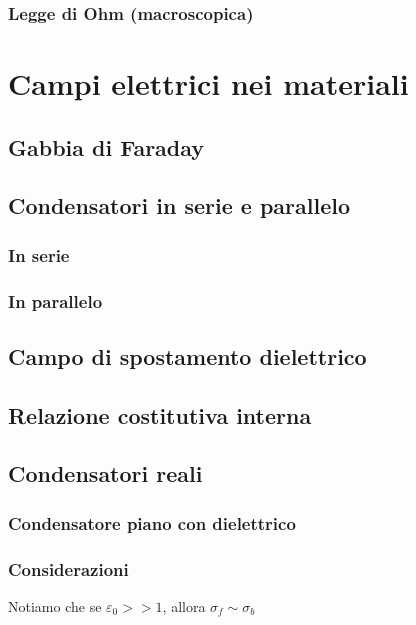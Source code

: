 \documentclass{book}
\begin{document}
\subsection{Legge di Ohm (macroscopica)}

\chapter{Campi elettrici nei materiali}
\section{Gabbia di Faraday}
\section{Condensatori in serie e parallelo}
\subsection{In serie}
\subsection{In parallelo}
\section{Campo di spostamento dielettrico}
\section{Relazione costitutiva interna}
\section{Condensatori reali}

\subsection{Condensatore piano con dielettrico}











\subsection{Considerazioni}




Notiamo che se $\varepsilon_0 >> 1$, allora $\sigma_f \sim \sigma_b$
\end{document}
